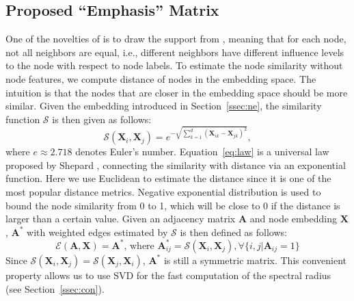 \subsection{ Proposed ``Emphasis'' Matrix} \label{ssec:att}
One of the novelties of \method is to draw the support from \ndiff, meaning that for each node, not all neighbors are equal, i.e., different neighbors have different influence levels to the node with respect to node labels.
To estimate the node similarity without node features, we compute distance of nodes in the embedding space. The intuition is that the nodes that are closer in the embedding space should be more similar. Given the embedding introduced in Section~\ref{ssec:ne}, the similarity function $\mathcal{S}$ is then given as follows:
\begin{equation} \label{eq:law}
    \mathcal{S}({\boldsymbol X}_{i}, {\boldsymbol X}_{j}) = e^{-\sqrt{\sum^{d}_{k=1}{({\boldsymbol X}_{ik} - {\boldsymbol X}_{jk})^{2}}}}, 
\end{equation}
where $e \approx 2.718$ denotes Euler's number. Equation~\ref{eq:law} is a universal law proposed by Shepard \cite{shepard1987toward}, connecting the similarity with distance via an exponential function. Here we use Euclidean to estimate the distance since it is one of the most popular distance metrics. Negative exponential distribution is used to bound the node similarity from 0 to 1, which will be close to 0 if the distance is larger than a certain value. Given an adjacency matrix ${\boldsymbol A}$ and node embedding ${\boldsymbol X}$, \emphasis ${\boldsymbol A}^{*}$ with weighted edges estimated by $\mathcal{S}$ is then defined as follows:
\begin{equation}
    \mathcal{E}({\boldsymbol A}, {\boldsymbol X}) = {\boldsymbol A}^{*} \text{, where } {\boldsymbol A}^{*}_{ij} = \mathcal{S}({\boldsymbol X}_{i}, {\boldsymbol X}_{j}), \forall \{i, j | {\boldsymbol A}_{ij} = 1\}
\end{equation}
Since $\mathcal{S}({\boldsymbol X}_{i}, {\boldsymbol X}_{j}) = \mathcal{S}({\boldsymbol X}_{j}, {\boldsymbol X}_{i})$, ${\boldsymbol A}^{*}$ is still a symmetric matrix. This convenient property allows us to use SVD for the fast computation of the spectral radius (see Section~\ref{ssec:con}).


